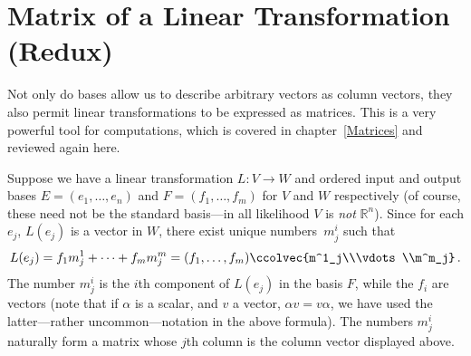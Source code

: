 \section{Matrix of a Linear Transformation (Redux)}

Not only do bases allow us to describe arbitrary vectors as column vectors, they also permit linear transformations
 to be expressed as matrices. This is a very powerful tool for computations, which is covered in chapter~\ref{Matrices} and
 reviewed again here.
 
Suppose we have a linear transformation $L \colon V\rightarrow W$ and 
ordered input and output bases $E=(e_1, \ldots, e_n)$ and $F=(f_1, \ldots, f_m)$ for $V$ and $W$ respectively (of course, these need not be the standard basis---in all likelihood $V$ is {\itshape not} ${\mathbb R}^n$). 
Since for each $e_j$, $L(e_j)$ is a vector in $W$, there exist unique  numbers~$m^i_j$ such that
\[
L(e_j)=f_1m^1_j + \cdots + f_mm^m_j =(f_1,\ldots, f_m) \ccolvec{m^1_j\\\vdots\\m^m_j}\, .
\]
The number $m^i_j$ is the $i$th component of $L(e_j)$ in the basis $F$, while the $f_i$ are vectors (note that if $\alpha$ is a scalar, and $v$ a vector, $\alpha v=v\alpha$, we have used the latter---rather uncommon---notation in the above formula).
The numbers $m^i_j$ naturally form a matrix whose $j$th column is the column vector displayed above. 
